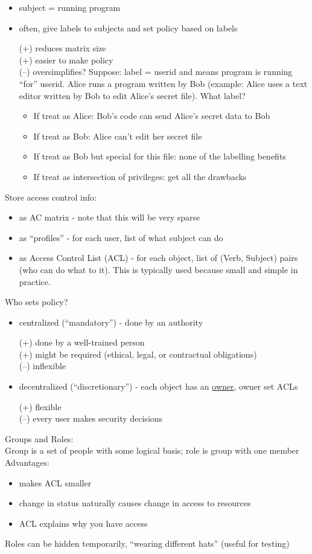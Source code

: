 \begin{itemize}
    \item subject = running program
    \item often, give labels to subjects and set policy based on labels

    (+) reduces matrix size\\
    (+) easier to make policy\\
    (--) oversimplifies? Suppose: label = userid and means program is running
    ``for'' userid. Alice runs a program written by Bob (example: Alice uses a
        text editor written by Bob to edit Alice's secret file). What label?
    \begin{itemize}
        \item If treat as Alice: Bob's code can send Alice's secret data to Bob
        \item If treat as Bob: Alice can't edit her secret file
        \item If treat as Bob but special for this file: none of the labelling
        benefits
        \item If treat as intersection of privileges: get all the drawbacks
    \end{itemize}
\end{itemize}
Store access control info:
\begin{itemize}
    \item as AC matrix - note that this will be very sparse
    \item as ``profiles'' - for each user, list of what subject can do
    \item as Access Control List (ACL) - for each object, list of (Verb,
            Subject) pairs (who can do what to it). This is typically used
    because small and simple in practice.
\end{itemize}
Who sets policy?
\begin{itemize}
    \item centralized (``mandatory'') - done by an authority

    (+) done by a well-trained person\\
    (+) might be required (ethical, legal, or contractual obligations)\\
    (--) inflexible
    \item decentralized (``discretionary'') - each object has an
    \underline{owner}, owner set ACLs

    (+) flexible\\
    (--) every user makes security decisions
\end{itemize}
Groups and Roles:\\
Group is a set of people with some logical basis; role is group with one
member\\
Advantages:
\begin{itemize}
    \item makes ACL smaller
    \item change in status naturally causes change in access to resources
    \item ACL explains why you have access
\end{itemize}
Roles can be hidden temporarily, ``wearing different hats'' (useful for testing)

